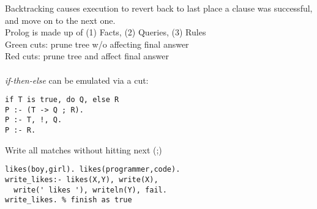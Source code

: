 \documentclass[8pt,letterpaper,twocolumn]{article}
\begin{document}
\textbullet Backtracking causes execution to revert back to last place a clause was successful, and move on to the next one.\\
\textbullet Prolog is made up of (1) Facts, (2) Queries, (3) Rules\\
\textbullet Green cuts: prune tree w/o affecting final answer\\
\textbullet Red cuts: prune tree and affect final answer\\
\\
\textbullet \emph{if-then-else} can be emulated via a cut:
\begin{verbatim}
if T is true, do Q, else R
P :- (T -> Q ; R).
P :- T, !, Q.
P :- R.
\end{verbatim}
\textbullet Write all matches without hitting next (;)
\begin{verbatim}
likes(boy,girl). likes(programmer,code).
write_likes:- likes(X,Y), write(X),
  write(' likes '), writeln(Y), fail.
write_likes. % finish as true
\end{verbatim}
\end{document}
